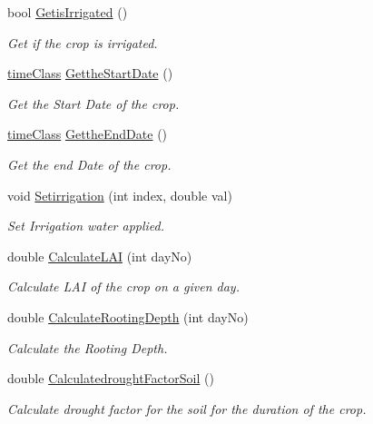 \begin{DoxyCompactItemize}
bool \mbox{\hyperlink{class_crop_class_a05dda60a40d7bad3e932a37acfffc0d5}{Getis\+Irrigated}} ()
\begin{DoxyCompactList}\small\item\em Get if the crop is irrigated. \end{DoxyCompactList}\item 
\mbox{\hyperlink{classtime_class}{time\+Class}} \mbox{\hyperlink{class_crop_class_aaa4a4eaf4aad0fd117c7d5f3c9f773a1}{Getthe\+Start\+Date}} ()
\begin{DoxyCompactList}\small\item\em Get the Start Date of the crop. \end{DoxyCompactList}\item 
\mbox{\hyperlink{classtime_class}{time\+Class}} \mbox{\hyperlink{class_crop_class_aaa5259912a66a71755997fbca4a3f6c1}{Getthe\+End\+Date}} ()
\begin{DoxyCompactList}\small\item\em Get the end Date of the crop. \end{DoxyCompactList}\item 
void \mbox{\hyperlink{class_crop_class_a3aebb49399ede5f75a08b00b492f005c}{Setirrigation}} (int index, double val)
\begin{DoxyCompactList}\small\item\em Set Irrigation water applied. \end{DoxyCompactList}\item 
double \mbox{\hyperlink{class_crop_class_a326d0d9193c44baa7e949bdcec4c352d}{Calculate\+L\+AI}} (int day\+No)
\begin{DoxyCompactList}\small\item\em Calculate L\+AI of the crop on a given day. \end{DoxyCompactList}\item 
double \mbox{\hyperlink{class_crop_class_ac0fd8bf1d136cdfdc45a9e28fdfa4e1e}{Calculate\+Rooting\+Depth}} (int day\+No)
\begin{DoxyCompactList}\small\item\em Calculate the Rooting Depth. \end{DoxyCompactList}\item 
double \mbox{\hyperlink{class_crop_class_a49c2ae9676cb0ef0a7127cfcafe404a6}{Calculatedrought\+Factor\+Soil}} ()
\begin{DoxyCompactList}\small\item\em Calculate drought factor for the soil for the duration of the crop. \end{DoxyCompactList}\item 

\end{DoxyCompactItemize}

